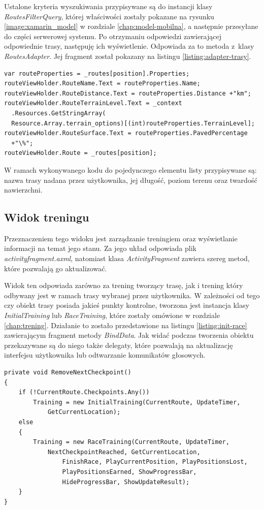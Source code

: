 Ustalone kryteria wyszukiwania przypisywane są do instancji klasy \textit{RoutesFilterQuery}, której właściwości zostały pokazane na rysunku \ref{image:xamarin_model} w rozdziale \ref{chap:model-mobilna}, a następnie przesyłane do części serwerowej systemu. Po otrzymaniu odpowiedzi zawierającej odpowiednie trasy, następuję ich wyświetlenie. Odpowiada za to metoda z~klasy \textit{RoutesAdapter}. Jej fragment został pokazany na listingu \ref{listing:adapter-trasy}.
\begin{lstlisting}[caption={Przypisanie cech trasy do elementu listy},label=listing:adapter-trasy]
var routeProperties = _routes[position].Properties;
routeViewHolder.RouteName.Text = routeProperties.Name;
routeViewHolder.RouteDistance.Text = routeProperties.Distance +"km";
routeViewHolder.RouteTerrainLevel.Text = _context
  .Resources.GetStringArray(
  Resource.Array.terrain_options)[(int)routeProperties.TerrainLevel];
routeViewHolder.RouteSurface.Text = routeProperties.PavedPercentage
  +"\%";
routeViewHolder.Route = _routes[position];
\end{lstlisting}
W ramach wykonywanego kodu do pojedynczego elementu listy przypisywane są: nazwa trasy nadana przez użytkownika, jej długość, poziom terenu oraz twardość nawierzchni.

\subsection{Widok treningu}
Przeznaczeniem tego widoku jest zarządzanie treningiem oraz wyświetlanie informacji na temat jego stanu. Za jego układ odpowiada plik \textit{activity\textunderscore fragment.axml}, natomiast klasa \textit{ActivityFragment} zawiera szereg metod, które pozwalają go aktualizować.

Widok ten odpowiada zarówno za trening tworzący trasę, jak i trening który odbywany jest w ramach trasy wybranej przez użytkownika. W zależności od tego czy obiekt trasy posiada jakieś punkty kontrolne, tworzona jest instancja klasy \textit{InitialTraining} lub \textit{RaceTraining}, które zostały omówione w rozdziale \ref{chap:trening}. Działanie to zostało przedstawione na listingu \ref{listing:init-race} zawierającym fragment metody \textit{BindData}. Jak widać podczas tworzenia obiektu przekazywane są do niego także delegaty, które pozwalają na aktualizację interfejsu użytkownika lub odtwarzanie komunikatów głosowych.
\begin{lstlisting}[caption={Utworzenie obiektu zawierającego logikę treningu},label=listing:init-race]
private void RemoveNextCheckpoint()
{
	if (!CurrentRoute.Checkpoints.Any())
	    Training = new InitialTraining(CurrentRoute, UpdateTimer,
	    	GetCurrentLocation);
	else
	{
	    Training = new RaceTraining(CurrentRoute, UpdateTimer,
	    	NextCheckpointReached, GetCurrentLocation, 
      	    	FinishRace, PlayCurrentPosition, PlayPositionsLost,
      	    	PlayPositionsEarned, ShowProgressBar,
      	    	HideProgressBar, ShowUpdateResult);
	}
}
\end{lstlisting}

